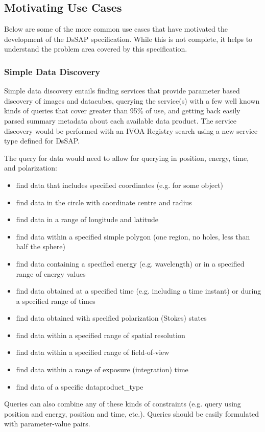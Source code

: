 \documentclass[11pt,a4paper]{ivoa}
\begin{document}
\subsection{Motivating Use Cases}
Below are some of the more common use cases that have motivated the development of the DsSAP specification. 
While this is not complete, it helps to understand the problem area covered by this specification.
\subsubsection{Simple Data Discovery}
Simple data discovery entails finding services that provide parameter based discovery of images and datacubes, querying the service(s) with a few well known kinds of queries that cover greater than 95\% of use, and getting back easily parsed summary metadata about each available data product. The service discovery would be performed with an IVOA Registry search using a new service type defined for DsSAP. 

The query for data would need to allow for querying in position, energy, time, and polarization:
\begin{itemize}
    \item find data that includes specified coordinates (e.g. for some object)
    \item find data in the circle with coordinate centre and radius
    \item find data in a range of longitude and latitude
    \item find data within a specified simple  polygon (one region, no holes, less than half the sphere)
    \item find data containing a specified energy (e.g. wavelength) or in a specified range of energy values
    \item find data obtained at a specified time (e.g. including a time instant) or during a specified range of times
    \item find data obtained with specified polarization (Stokes) states
    \item find data within a specified range of spatial resolution
    \item find data within a specified range of field-of-view
    \item find data within a range of exposure (integration) time
    \item find data of a specific dataproduct\_type	    
\end{itemize}
Queries can also combine any of these kinds of constraints (e.g. query using
position and energy, position and time, etc.). Queries should be easily formulated with parameter-value pairs.
\end{document}
